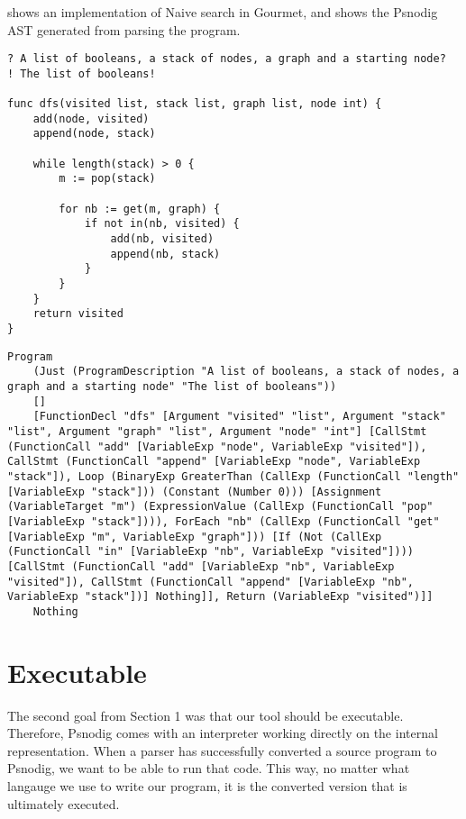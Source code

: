  shows an implementation of Naive search in Gourmet, and  shows the Psnodig AST generated from parsing the program. \\

\begin{lstlisting}[caption={DFS implementation in Gourmet.}, captionpos=b, label={dfsGourmet}]
? A list of booleans, a stack of nodes, a graph and a starting node?
! The list of booleans!

func dfs(visited list, stack list, graph list, node int) {
    add(node, visited)
    append(node, stack)

    while length(stack) > 0 {
        m := pop(stack)

        for nb := get(m, graph) {
            if not in(nb, visited) {
                add(nb, visited)
                append(nb, stack)
            }
        }
    }
    return visited
}
\end{lstlisting}

\begin{lstlisting}[caption={The Psnodig AST generated by parsing \Cref{dfsGourmet}.}, captionpos=b, label={dfsAST}]
Program
    (Just (ProgramDescription "A list of booleans, a stack of nodes, a graph and a starting node" "The list of booleans"))
    []
    [FunctionDecl "dfs" [Argument "visited" "list", Argument "stack" "list", Argument "graph" "list", Argument "node" "int"] [CallStmt (FunctionCall "add" [VariableExp "node", VariableExp "visited"]), CallStmt (FunctionCall "append" [VariableExp "node", VariableExp "stack"]), Loop (BinaryExp GreaterThan (CallExp (FunctionCall "length" [VariableExp "stack"])) (Constant (Number 0))) [Assignment (VariableTarget "m") (ExpressionValue (CallExp (FunctionCall "pop" [VariableExp "stack"]))), ForEach "nb" (CallExp (FunctionCall "get" [VariableExp "m", VariableExp "graph"])) [If (Not (CallExp (FunctionCall "in" [VariableExp "nb", VariableExp "visited"]))) [CallStmt (FunctionCall "add" [VariableExp "nb", VariableExp "visited"]), CallStmt (FunctionCall "append" [VariableExp "nb", VariableExp "stack"])] Nothing]], Return (VariableExp "visited")]]
    Nothing
\end{lstlisting}

\section{Executable}

The second goal from Section 1 was that our tool should be executable. Therefore, Psnodig comes with an interpreter working directly on the internal representation. When a parser has successfully converted a source program to Psnodig, we want to be able to run that code. This way, no matter what langauge we use to write our program, it is the converted version that is ultimately executed. \\

